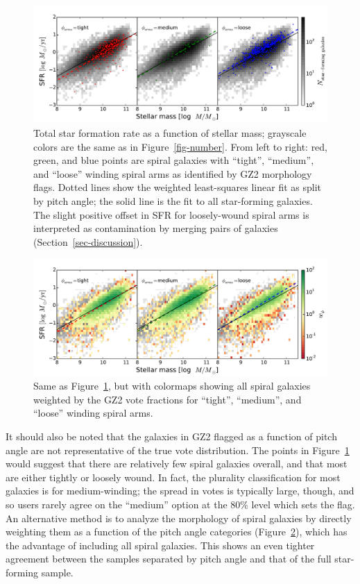 \documentclass[useAMS,usenatbib]{mn2e}
\begin{document}
\begin{figure}
\includegraphics[angle=0,width=7.0in]{figures/masslim/ms_arms_winding.pdf}
\caption{Total star formation rate as a function of stellar mass; grayscale colors are the same as in Figure~\ref{fig-number}. From left to right: red, green, and blue points are spiral galaxies with ``tight'', ``medium'', and ``loose'' winding spiral arms as identified by GZ2 morphology flags. Dotted lines show the weighted least-squares linear fit as split by pitch angle; the solid line is the fit to all star-forming galaxies. The slight positive offset in SFR for loosely-wound spiral arms is interpreted as contamination by merging pairs of galaxies (Section~\ref{sec-discussion}).
\label{fig-winding}}
\end{figure}

\begin{figure}
\includegraphics[angle=0,width=7.0in]{figures/masslim/ms_arms_winding_weighted.pdf}
\caption{Same as Figure~\ref{fig-winding}, but with colormaps showing all spiral galaxies weighted by the GZ2 vote fractions for ``tight'', ``medium'', and ``loose'' winding spiral arms. 
\label{fig-winding_weighted}}
\end{figure}

It should also be noted that the galaxies in GZ2 flagged as a function of pitch angle are not representative of the true vote distribution. The points in Figure~\ref{fig-winding} would suggest that there are relatively few spiral galaxies overall, and that most are either tightly or loosely wound. In fact, the plurality classification for most galaxies is for medium-winding; the spread in votes is typically large, though, and so users rarely agree on the ``medium'' option at the 80\% level which sets the flag. An alternative method is to analyze the morphology of spiral galaxies by directly weighting them as a function of the pitch angle categories (Figure~\ref{fig-winding_weighted}), which has the advantage of including all spiral galaxies. This shows an even tighter agreement between the samples separated by pitch angle and that of the full star-forming sample.
\end{document}
